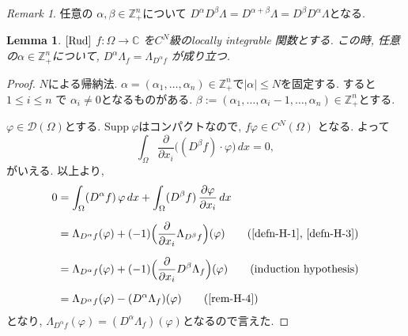 \documentclass[dvipdfmx,a4paper,11pt]{article} %
\newtheorem{lem}[thm]{Lemma}
\theoremstyle{definition}
\theoremstyle{remark}
\newtheorem{rem}[thm]{Remark}
\numberwithin{equation}{section}
\newcommand{\N}{\mathbb{Z}_+}
\begin{document}
\begin{rem}
\label{rem-H-4}
任意の \(\alpha, \beta \in \N^n\)について \(D^\alpha D^\beta \Lambda = D^{\alpha + \beta} \Lambda = D^\beta D^\alpha \Lambda\)となる. 
\end{rem}

\begin{tcolorbox}[mybox]
\begin{lem}{$\cite[6.13]{Rud}$}
\label{lem-H-5}
\(f : \Omega \to \mathbb{C}\) を$C^N$級のlocally integrable 関数とする.
この時, 任意の$\alpha \in \N^n$について, \(D^\alpha \Lambda_f = \Lambda_{D^\alpha f}\) 
が成り立つ. 
\end{lem}
\end{tcolorbox}

\begin{proof}
 \(N\)による帰納法. 
\(\alpha = (\alpha_1, \dots, \alpha_n) \in \N^n\)で\(|\alpha| \le N\)を固定する. 
すると\(1 \le i \le n\) で \(\alpha_i \neq 0\)となるものがある. 
 \(\beta := (\alpha_1, \dots, \alpha_i - 1, \dots, \alpha_n) \in \N^n\)とする. 

$\varphi \in \mathcal{D}(\Omega)$とする. 
\(\mathrm{Supp} \ \varphi\)はコンパクトなので,  \(f\varphi \in C^N(\Omega)\)
となる. よって
\[
\int_\Omega \frac{\partial}{\partial x_i} \big( (D^\beta f) \cdot \varphi \big) \, dx = 0,
\]
がいえる. 
以上より, 
\begin{align}
0 &= \int_{\Omega} (D^{\alpha} f)\,\varphi\,dx
   + \int_{\Omega} (D^{\beta} f)\,\frac{\partial\varphi}{\partial x_i}\,dx \notag \\[6pt]
&= \Lambda_{D^{\alpha} f}(\varphi)
   + (-1)\Bigl(\frac{\partial}{\partial x_i}\Lambda_{D^{\beta} f}\Bigr)(\varphi)
   \tag*{\text{(\ref{defn-H-1}, \ref{defn-H-3})}} \\[6pt]
&= \Lambda_{D^{\alpha} f}(\varphi)
   + (-1)\Bigl(\frac{\partial}{\partial x_i}D^{\beta}\Lambda_f\Bigr)(\varphi)
   \tag*{\text{(induction hypothesis)}} \\[6pt]
&= \Lambda_{D^{\alpha} f}(\varphi)
   - (D^{\alpha}\Lambda_f)(\varphi)
   \tag*{\text{(\ref{rem-H-4})}}
\end{align}
となり, $\Lambda_{D^{\alpha} f}(\varphi) = (D^{\alpha}\Lambda_f)(\varphi)$となるので言えた. 
\end{proof}
\end{document}
